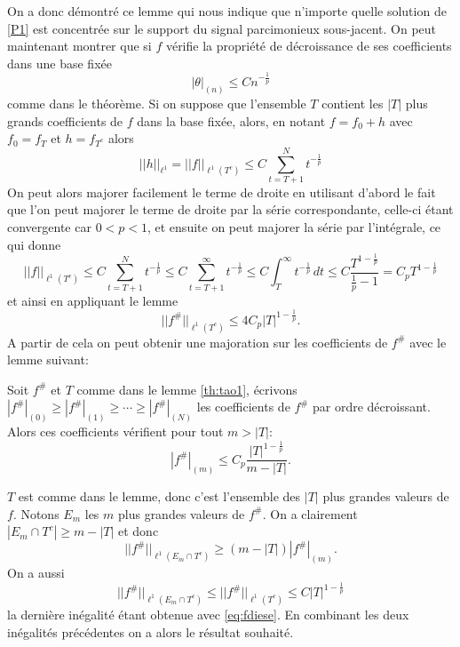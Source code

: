 On a donc démontré ce lemme qui nous indique que n'importe quelle solution de \ref{P1} est concentrée sur le support du signal parcimonieux sous-jacent.
On peut maintenant montrer que si $f$ vérifie la propriété de décroissance de ses coefficients dans une base fixée
\begin{equation}
	|\theta|_{(n)} \leq Cn^{-\frac{1}{p}}
\end{equation}
comme dans le théorème.
Si on suppose que l'ensemble $T$ contient les $|T|$ plus grands coefficients de $f$ dans la base fixée, alors, en notant $f = f_0 + h$ avec $f_0 = f_T$ et $h = f_{T^c}$ alors
\begin{equation}
	||h||_{\ell^1} = ||f||_{\ell^1(T^c)} \leq C \sum_{t=T+1}^N t^{-\frac{1}{p}}
\end{equation}
On peut alors majorer facilement le terme de droite en utilisant d'abord le fait que l'on peut majorer le terme de droite par la série correspondante, celle-ci étant convergente car $0<p<1$, et ensuite on peut majorer la série par l'intégrale, ce qui donne
\begin{equation}
	||f||_{\ell^1(T^c)} \leq C \sum_{t=T+1}^N t^{-\frac{1}{p}} \leq C\sum_{t=T+1}^\infty t^{-\frac{1}{p}} \leq C\int_T^\infty t^{-\frac{1}{p}}\,dt \leq C\frac{T^{1-\frac{1}{p}}}{\frac{1}{p}-1} = C_p T^{1-\frac{1}{p}} 
\end{equation}
et ainsi en appliquant le lemme
\begin{equation}\label{eq:fdiese}
	||f^\#||_{\ell^1(T^c)} \leq 4C_p |T|^{1-\frac{1}{p}}.
\end{equation}
A partir de cela on peut obtenir une majoration sur les coefficients de $f^\#$ avec le lemme suivant:
\begin{lemme}\label{th:tao2}
	Soit $f^\#$ et $T$ comme dans le lemme \ref{th:tao1}, écrivons $|f^\#|_{(0)} \geq |f^\#|_{(1)} \geq \cdots \geq |f^\#|_{(N)}$ les coefficients de $f^\#$ par ordre décroissant.
	Alors ces coefficients vérifient pour tout $m>|T|$:
	\begin{equation}
		|f^\#|_{(m)} \leq C_p \frac{|T|^{1-\frac{1}{p}}}{m - |T|}.
	\end{equation}
\end{lemme}
\begin{preuve}
	$T$ est comme dans le lemme, donc c'est l'ensemble des $|T|$ plus grandes valeurs de $f$. Notons $E_m$ les $m$ plus grandes valeurs de $f^\#$. On a clairement $|E_m \cap T^c| \geq m - |T|$ et donc
	\begin{equation}
		||f^\#||_{\ell^1(E_m \cap T^c)} \geq (m-|T|)|f^\#|_{(m)}.
	\end{equation}
	On a aussi 
	\begin{equation}
		||f^\#||_{\ell^1(E_m \cap T^c)} \leq ||f^\#||_{\ell^1(T^c)} \leq C |T|^{1-\frac{1}{p}}
	\end{equation}
	la dernière inégalité étant obtenue avec \ref{eq:fdiese}.
	En combinant les deux inégalités précédentes on a alors le résultat souhaité.
\end{preuve}
